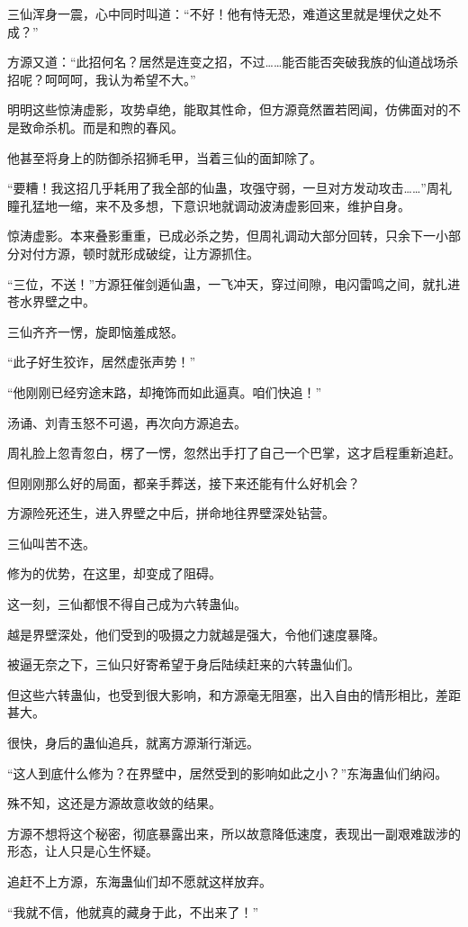 \begin{this_body}
三仙浑身一震，心中同时叫道：“不好！他有恃无恐，难道这里就是埋伏之处不成？”

方源又道：“此招何名？居然是连变之招，不过……能否能否突破我族的仙道战场杀招呢？呵呵呵，我认为希望不大。”

明明这些惊涛虚影，攻势卓绝，能取其性命，但方源竟然置若罔闻，仿佛面对的不是致命杀机。而是和煦的春风。

他甚至将身上的防御杀招狮毛甲，当着三仙的面卸除了。

“要糟！我这招几乎耗用了我全部的仙蛊，攻强守弱，一旦对方发动攻击……”周礼瞳孔猛地一缩，来不及多想，下意识地就调动波涛虚影回来，维护自身。

惊涛虚影。本来叠影重重，已成必杀之势，但周礼调动大部分回转，只余下一小部分对付方源，顿时就形成破绽，让方源抓住。

“三位，不送！”方源狂催剑遁仙蛊，一飞冲天，穿过间隙，电闪雷鸣之间，就扎进苍水界壁之中。

三仙齐齐一愣，旋即恼羞成怒。

“此子好生狡诈，居然虚张声势！”

“他刚刚已经穷途末路，却掩饰而如此逼真。咱们快追！”

汤诵、刘青玉怒不可遏，再次向方源追去。

周礼脸上忽青忽白，楞了一愣，忽然出手打了自己一个巴掌，这才启程重新追赶。

但刚刚那么好的局面，都亲手葬送，接下来还能有什么好机会？

方源险死还生，进入界壁之中后，拼命地往界壁深处钻营。

三仙叫苦不迭。

修为的优势，在这里，却变成了阻碍。

这一刻，三仙都恨不得自己成为六转蛊仙。

越是界壁深处，他们受到的吸摄之力就越是强大，令他们速度暴降。

被逼无奈之下，三仙只好寄希望于身后陆续赶来的六转蛊仙们。

但这些六转蛊仙，也受到很大影响，和方源毫无阻塞，出入自由的情形相比，差距甚大。

很快，身后的蛊仙追兵，就离方源渐行渐远。

“这人到底什么修为？在界壁中，居然受到的影响如此之小？”东海蛊仙们纳闷。

殊不知，这还是方源故意收敛的结果。

方源不想将这个秘密，彻底暴露出来，所以故意降低速度，表现出一副艰难跋涉的形态，让人只是心生怀疑。

追赶不上方源，东海蛊仙们却不愿就这样放弃。

“我就不信，他就真的藏身于此，不出来了！”


\end{this_body}
